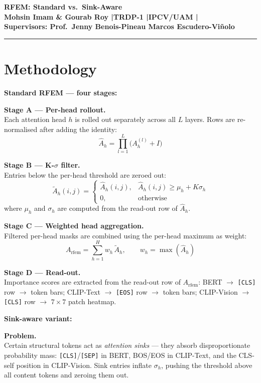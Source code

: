 \documentclass[a4paper,11pt]{article}
\begin{document}
{\centering
  \Large\bfseries RFEM: Standard vs.\ Sink-Aware\\[6pt]
  \normalsize Mohsin Imam \& Gourab Roy \quad|\quad TRDP-1 \quad|\quad IPCV/UAM \quad|\\[2pt]
  \small Supervisors: Prof.\ Jenny Benois-Pineau \quad Marcos Escudero-Vi\~{n}olo\\[4pt]
}
\noindent\rule{\linewidth}{0.8pt}

\section*{Methodology}

\textbf{Standard RFEM — four stages:}

\medskip
\textbf{Stage A — Per-head rollout.}\\
Each attention head $h$ is rolled out separately across all $L$ layers. Rows are re-normalised after adding the identity:
\[
  \hat{A}_h = \prod_{l=1}^{L}\!\bigl(A_h^{(l)} + I\bigr)
\]

\medskip
\textbf{Stage B — K-$\sigma$ filter.}\\
Entries below the per-head threshold are zeroed out:
\[
  \tilde{A}_h(i,j) = \begin{cases} \hat{A}_h(i,j), & \hat{A}_h(i,j) \geq \mu_h + K\sigma_h \\ 0, & \text{otherwise} \end{cases}
\]
where $\mu_h$ and $\sigma_h$ are computed from the read-out row of $\hat{A}_h$.

\medskip
\textbf{Stage C — Weighted head aggregation.}\\
Filtered per-head masks are combined using the per-head maximum as weight:
\[
  A_{\mathrm{rfem}} = \sum_{h=1}^{H} w_h\,\tilde{A}_h, \qquad w_h = \max(\hat{A}_h)
\]

\medskip
\textbf{Stage D — Read-out.}\\
Importance scores are extracted from the read-out row of $A_{\mathrm{rfem}}$:
BERT $\to$ \texttt{[CLS]} row $\to$ token bars;\quad
CLIP-Text $\to$ \texttt{[EOS]} row $\to$ token bars;\quad
CLIP-Vision $\to$ \texttt{[CLS]} row $\to$ $7{\times}7$ patch heatmap.

\bigskip
\textbf{Sink-aware variant:}

\medskip
\textbf{Problem.}\\
Certain structural tokens act as \emph{attention sinks} — they absorb disproportionate probability mass: \texttt{[CLS]}/\texttt{[SEP]} in BERT, BOS/EOS in CLIP-Text, and the CLS-self position in CLIP-Vision. Sink entries inflate $\sigma_h$, pushing the threshold above all content tokens and zeroing them out.
\end{document}
